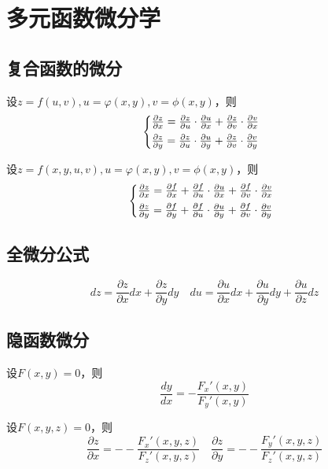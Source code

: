 \documentclass[a4paper,zihao=-4,UTF8]{ctexbook}
\begin{document}
\section{多元函数微分学}
\subsection{复合函数的微分}
设$z=f(u,v), u=\varphi(x,y), v=\phi(x,y)$，则
\begin{equation*}
\left\{%
\begin{array}{@{}l}    
    \frac{\partial z}{\partial x}=\frac{\partial z}{\partial u}\cdot\frac{\partial u}{\partial x}+\frac{\partial z}{\partial v}\cdot\frac{\partial v}{\partial x}\\[5pt]
    \frac{\partial z}{\partial y}=\frac{\partial z}{\partial u}\cdot\frac{\partial u}{\partial y}+\frac{\partial z}{\partial v}\cdot\frac{\partial v}{\partial y}\\
\end{array}
\right.
\end{equation*}

设$z=f(x,y,u,v), u=\varphi(x,y), v=\phi(x,y)$，则
\begin{equation*}
\left\{%
\begin{array}{@{}l}    
    \frac{\partial z}{\partial x}=\frac{\partial f}{\partial x}+\frac{\partial f}{\partial u}\cdot\frac{\partial u}{\partial x}+\frac{\partial f}{\partial v}\cdot\frac{\partial v}{\partial x}\\[5pt]
    \frac{\partial z}{\partial y}=\frac{\partial f}{\partial y}+\frac{\partial f}{\partial u}\cdot\frac{\partial u}{\partial y}+\frac{\partial f}{\partial v}\cdot\frac{\partial v}{\partial y}\\
\end{array}
\right.
\end{equation*}
\subsection{全微分公式}
\[dz=\frac{\partial z}{\partial x}dx+\frac{\partial z}{\partial y}dy
\quad du=\frac{\partial u}{\partial x}dx+\frac{\partial u}{\partial y}dy+\frac{\partial u}{\partial z}dz\]
\subsection{隐函数微分}
设$F(x,y)=0$，则
\[\frac{d y}{d x}=-\frac{F_x'(x,y)}{F_y'(x,y)}\]

设$F(x,y,z)=0$，则
\[\frac{\partial z}{\partial x}=--\frac{F_x'(x,y,z)}{F_z'(x,y,z)}\quad \frac{\partial z}{\partial y}=--\frac{F_y'(x,y,z)}{F_z'(x,y,z)}\]
\end{document}
